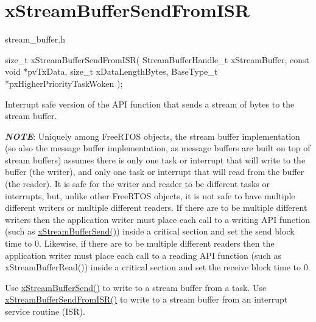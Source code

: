 \hypertarget{group__xStreamBufferSendFromISR}{}\section{x\+Stream\+Buffer\+Send\+From\+I\+SR}
\label{group__xStreamBufferSendFromISR}
stream\+\_\+buffer.\+h


\begin{DoxyPre}
size\_t xStreamBufferSendFromISR( StreamBufferHandle\_t xStreamBuffer,
                                 const void *pvTxData,
                                 size\_t xDataLengthBytes,
                                 BaseType\_t *pxHigherPriorityTaskWoken );
\end{DoxyPre}


Interrupt safe version of the A\+PI function that sends a stream of bytes to the stream buffer.

{\itshape {\bfseries N\+O\+TE}}\+: Uniquely among Free\+R\+T\+OS objects, the stream buffer implementation (so also the message buffer implementation, as message buffers are built on top of stream buffers) assumes there is only one task or interrupt that will write to the buffer (the writer), and only one task or interrupt that will read from the buffer (the reader). It is safe for the writer and reader to be different tasks or interrupts, but, unlike other Free\+R\+T\+OS objects, it is not safe to have multiple different writers or multiple different readers. If there are to be multiple different writers then the application writer must place each call to a writing A\+PI function (such as \hyperlink{stream__buffer_8h_a35cdf3b6bf677086b9128782f762499d}{x\+Stream\+Buffer\+Send()}) inside a critical section and set the send block time to 0. Likewise, if there are to be multiple different readers then the application writer must place each call to a reading A\+PI function (such as x\+Stream\+Buffer\+Read()) inside a critical section and set the receive block time to 0.

Use \hyperlink{stream__buffer_8h_a35cdf3b6bf677086b9128782f762499d}{x\+Stream\+Buffer\+Send()} to write to a stream buffer from a task. Use \hyperlink{stream__buffer_8h_a1dab226e99230e01e79bc2b5c0605e44}{x\+Stream\+Buffer\+Send\+From\+I\+S\+R()} to write to a stream buffer from an interrupt service routine (I\+SR).


